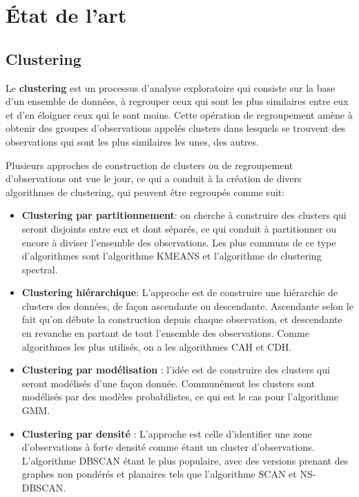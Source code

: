 \chapter{État de l'art}

    \section{Clustering}
  	  Le \textbf{clustering} est un processus d'analyse exploratoire qui consiste sur la base d’un ensemble de données, à regrouper ceux qui sont les plus similaires entre eux et d'en éloigner ceux qui le sont moins.
  	  Cette opération de regroupement amène à obtenir des groupes d’observations appelés clusters dans lesquels se trouvent des observations qui sont les plus similaires les unes, des autres.
      
  	  Plusieurs approches de construction de clusters ou de regroupement d’observations ont vue le jour, ce qui a conduit à la création de divers algorithmes de clustering, qui peuvent être regroupés comme suit:

  	  \begin{itemize}
  		  \item \textbf{Clustering par partitionnement}: on cherche à construire des clusters qui seront disjoints entre eux et dont séparés, ce qui conduit à partitionner ou encore à diviser l’ensemble des observations. Les plus communs de ce type d’algorithmes sont l'algorithme KMEANS et l'algorithme de clustering spectral.
     	 
  		  \item \textbf{Clustering hiérarchique}: L’approche est de construire une hiérarchie de clusters des données, de façon ascendante ou descendante. Ascendante selon le fait qu’on débute la construction depuis chaque observation, et descendante en revanche en partant de tout l’ensemble des observations. Comme algorithmes les plus utilisés, on a les algorithmes \acrfull{CAH} et \acrfull{CDH}.
    
  		  \item \textbf{Clustering par modélisation} : l’idée est de construire des clusters qui seront modélisés d’une façon donnée. Communément les clusters sont modélisés par des modèles probabilistes, ce qui est le cas pour l’algorithme \acrfull{GMM}.
    
  		  \item \textbf{Clustering par densité} : L’approche est celle d’identifier une zone d’observations à forte densité comme étant un cluster d’observations. L'algorithme \acrfull{DBSCAN} étant le plus populaire, avec des versions prenant des graphes non pondérés et planaires tels que l'algorithme \acrfull{SCAN} et \acrfull{NS-DBSCAN}.
     	 
  	  \end{itemize}
    
